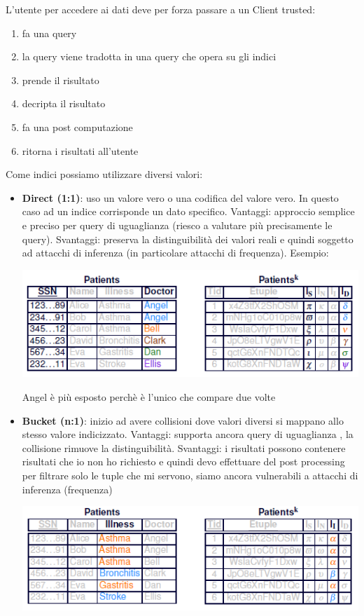 L'utente per accedere ai dati deve per forza passare a un Client trusted:
\begin{enumerate}
    \item fa una query
    \item la query viene tradotta in una query che opera su gli indici
    \item prende il risultato
    \item decripta il risultato
    \item fa una post computazione
    \item ritorna i risultati all'utente
\end{enumerate}
Come indici possiamo utilizzare diversi valori:
\begin{itemize}
    \item \textbf{Direct (1:1)}: uso un valore vero o una codifica del valore vero. In questo caso ad un indice corrisponde un dato specifico. Vantaggi: approccio semplice e preciso per query di uguaglianza (riesco a valutare più precisamente le query). Svantaggi: preserva la distinguibilità dei valori reali e quindi soggetto ad attacchi di inferenza (in particolare attacchi di frequenza). Esempio:
    \begin{center}
        \includegraphics[scale=0.6]{img/dirind.png}
    \end{center}
    Angel è più esposto perchè è l'unico che compare due volte
    \item \textbf{Bucket (n:1)}: inizio ad avere collisioni dove valori diversi si mappano allo stesso valore indicizzato. Vantaggi: supporta ancora query di uguaglianza , la collisione rimuove la distinguibilità. Svantaggi: i risultati possono contenere risultati che io non ho richiesto e quindi devo effettuare del post processing per filtrare solo le tuple che mi servono, siamo ancora vulnerabili a attacchi di inferenza (frequenza)
    \begin{center}
        \includegraphics[scale=0.6]{img/bucketind.png}

\end{center}
\end{itemize}
